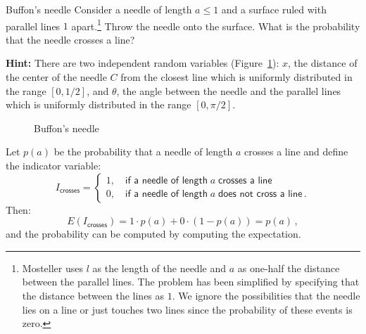 \begin{prob}{Buffon's needle}
Consider a needle of length $a\leq 1$ and a surface ruled with parallel lines $1$ apart.\footnote{Mosteller uses $l$ as the length of the needle and $a$ as one-half the distance between the parallel lines. The problem has been simplified by specifying that the distance between the lines as $1$. We ignore the possibilities that the needle lies on a line or just touches two lines since the probability of these events is zero.} Throw the needle onto the surface. What is the probability that the needle crosses a line?

\textbf{Hint:} There are two independent random variables (Figure~\ref{f.buffon1}): $x$, the distance of the center of the needle $C$ from the closest line which is uniformly distributed in the range $[0,1/2]$, and $\theta$, the angle between the needle and the parallel lines which is uniformly distributed in the range $[0,\pi/2]$.

\begin{figure}[tb]
\begin{center}
\end{center}
\caption{Buffon's needle}\label{f.buffon1}
\end{figure}
\end{prob}


Let $p(a)$ be the probability that a needle of length $a$ crosses a line and define the indicator variable:
\[
I_{\textsf{crosses}}=
\left\{
\begin{array}{ll}
1,\quad \textsf{if a needle of length}\;a\;\textsf{crosses a line}\\
0, \quad \textsf{if a needle of length}\;a\;\textsf{does not cross a line}\,.
\end{array}
\right.
\]
Then:
\begin{equation}\label{eq.buffon-probability}
E(I_{\textsf{crosses}})=1\cdot p(a) + 0\cdot (1-p(a))=p(a)\,,
\end{equation}
and the probability can be computed by computing the expectation.

